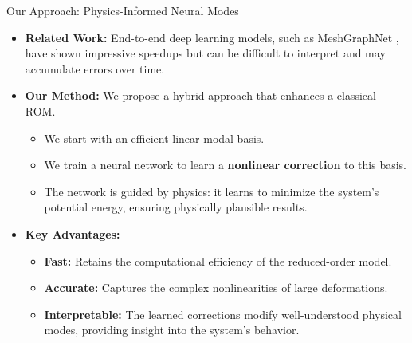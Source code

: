 \documentclass{beamer}
\begin{document}
\begin{frame}{Our Approach: Physics-Informed Neural Modes}
    \begin{itemize}
        \item \textbf{Related Work:} End-to-end deep learning models, such as MeshGraphNet \cite{pfaffLearningMeshBasedSimulation2021a}, have shown impressive speedups but can be difficult to interpret and may accumulate errors over time.
        
        \item \textbf{Our Method:} We propose a hybrid approach that enhances a classical ROM.
        \begin{itemize}
            \item We start with an efficient linear modal basis.
            \item We train a neural network to learn a \textbf{nonlinear correction} to this basis.
            \item The network is guided by physics: it learns to minimize the system's potential energy, ensuring physically plausible results.
        \end{itemize}
        
        \item \textbf{Key Advantages:}
        \begin{itemize}
            \item \textbf{Fast:} Retains the computational efficiency of the reduced-order model.
            \item \textbf{Accurate:} Captures the complex nonlinearities of large deformations.
            \item \textbf{Interpretable:} The learned corrections modify well-understood physical modes, providing insight into the system's behavior.
        \end{itemize}
        
    \end{itemize}
\end{frame}
\end{document}
